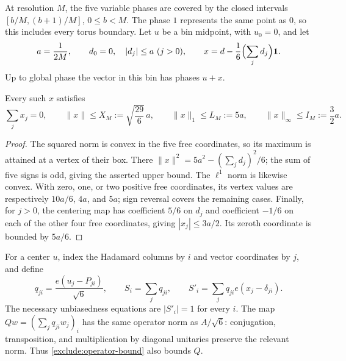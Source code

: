 At resolution $M$, the five variable phases are covered by the closed
intervals $[b/M,(b+1)/M]$, $0\le b<M$.  The phase $1$ represents the
same point as $0$, so this includes every torus boundary.  Let $u$ be
a bin midpoint, with $u_0=0$, and let
\[
 a=\frac1{2M},\qquad d_0=0,\quad |d_j|\le a\ (j>0),\qquad
 x=d-\frac16\Bigl(\sum_jd_j\Bigr)\mathbf1.
\]
Up to global phase the vector in this bin has phases $u+x$.

\begin{lemma}
\label{exclude:bin-geometry}
Every such $x$ satisfies
\begin{equation}
 \sum_jx_j=0,\qquad
 \|x\|\le X_M:=\sqrt{\frac{29}{6}}\,a,\qquad
 \|x\|_1\le L_M:=5a,\qquad
 \|x\|_\infty\le I_M:=\frac32a.
 \label{exclude:bin-bounds}
\end{equation}
\end{lemma}
\begin{proof}
The squared norm is convex in the five free coordinates, so its maximum
is attained at a vertex of their box.  There
$\|x\|^2=5a^2-(\sum_jd_j)^2/6$; the sum of five signs is odd, giving
the asserted upper bound.  The $\ell^1$ norm is likewise convex.
With zero, one, or two positive free coordinates, its vertex values
are respectively $10a/6$, $4a$, and $5a$; sign reversal covers the
remaining cases.  Finally, for $j>0$, the centering map has coefficient
$5/6$ on $d_j$ and coefficient $-1/6$ on each of the other four free
coordinates, giving $|x_j|\le3a/2$.  Its zeroth coordinate is bounded
by $5a/6$.
\end{proof}

For a center $u$, index the Hadamard columns by $i$ and vector coordinates
by $j$, and define
\begin{equation}
 q_{ji}=\frac{e(u_j-P_{ji})}{\sqrt6},\qquad
 S_i=\sum_jq_{ji},\qquad
 S'_i=\sum_jq_{ji}e(x_j-\delta_{ji}).
 \label{exclude:single-sums}
\end{equation}
The necessary unbiasedness equations are $|S'_i|=1$ for every $i$.
The map $Qw=(\sum_jq_{ji}w_j)_i$ has the same operator norm as
$A/\sqrt6$: conjugation, transposition, and multiplication by diagonal
unitaries preserve the relevant norm.  Thus \eqref{exclude:operator-bound}
also bounds $Q$.

